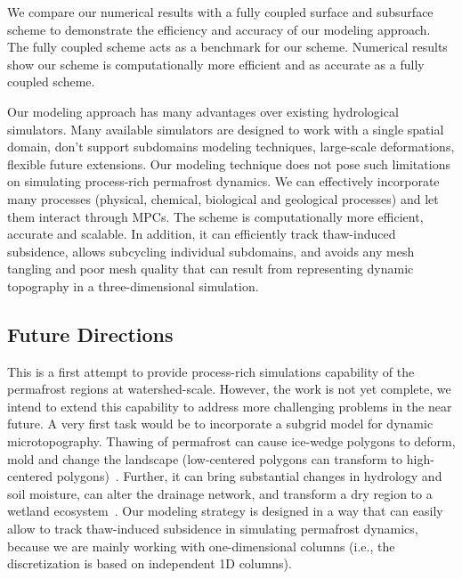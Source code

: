 \documentclass[review]{elsarticle}
\begin{document}
We compare our numerical results with a fully coupled surface and subsurface scheme to demonstrate the efficiency and accuracy of our modeling approach. The fully coupled scheme acts as a benchmark for our scheme. Numerical results show our scheme is computationally more efficient and as accurate as a fully coupled scheme. 

Our modeling approach has many advantages over existing hydrological simulators. Many available simulators are designed to work with a single spatial domain, don't support subdomains modeling techniques, large-scale deformations, flexible future extensions. Our modeling technique does not pose such limitations on simulating process-rich permafrost dynamics. We can effectively incorporate many processes (physical, chemical, biological and geological processes) and let them interact through MPCs. The scheme is computationally more efficient, accurate and scalable. In addition, it can efficiently track thaw-induced subsidence, allows subcycling individual subdomains, and avoids any mesh tangling and poor mesh quality that can result from representing dynamic topography in a three-dimensional simulation.
 

 
\subsection{Future Directions}
This is a first attempt to provide process-rich simulations capability of the permafrost regions at watershed-scale. However, the work is not yet complete, we intend to  extend this capability to address more challenging problems in the near future. A very first task would be to incorporate a subgrid model for dynamic microtopography. Thawing of permafrost can cause ice-wedge polygons to deform, mold and change the landscape (low-centered polygons can transform to high-centered polygons)~\cite{jorgenson2006abrupt,liljedahl2012ice}. Further, it can bring substantial changes in hydrology and soil moisture, can alter the drainage network, and transform a dry region to a wetland ecosystem~\cite{hinzman2005evidence,rowland2010arctic}. Our modeling strategy is designed in a way that can easily allow to track thaw-induced subsidence in simulating permafrost dynamics, because we are mainly working with one-dimensional columns (i.e., the discretization is based on independent 1D columns).




\end{document}
